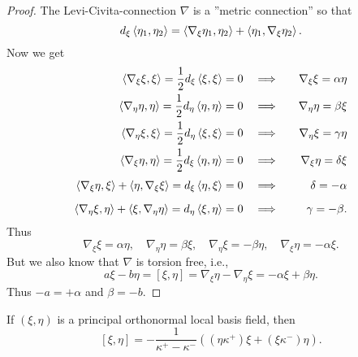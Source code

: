 \begin{proof}
	
	The Levi-Civita-connection $ \nabla $ is a ''metric connection'' so that 
		\[ d_\xi\left \langle \eta_1,\eta_2 \right\rangle = \left \langle \nabla_\xi \eta_1,\eta_2 \right\rangle +\left \langle \eta_1,\nabla_\xi \eta_2 \right\rangle. \]
	Now we get
	\begin{align*}
		\left \langle \nabla_\xi \xi,\xi \right\rangle = \dfrac{1}{2} d_\xi\left \langle \xi,\xi \right\rangle = 0 
			&&& \Longrightarrow &&& \nabla_\xi\xi = \alpha\eta\\
		\left \langle \nabla_\eta \eta,\eta \right\rangle = \dfrac{1}{2} d_\eta\left \langle \eta,\eta \right\rangle = 0 
			&&& \Longrightarrow &&& \nabla_\eta \eta  = \beta \xi \\
		\left \langle \nabla_\eta \xi, \xi \right\rangle = \frac 12 d_\eta \left \langle \xi,\xi \right\rangle = 0 
			&&& \Longrightarrow &&& \nabla_\eta \xi  = \gamma \eta \\
		\left \langle \nabla_\xi \eta, \eta \right\rangle = \frac 12 d_\xi \left \langle \eta,\eta \right\rangle = 0 
			&&& \Longrightarrow &&& \nabla_\xi \eta  = \delta \xi \\[1mm]
		\left \langle \nabla_\xi \eta,\xi \right\rangle + \left \langle \eta,\nabla_\xi \xi \right\rangle = d_\xi\left \langle \eta,\xi \right\rangle = 0
			&&& \Longrightarrow &&&  \delta =- \alpha \\[2mm]
		\left \langle \nabla_\eta \xi,\eta \right\rangle + \left \langle \xi,\nabla_\eta \eta \right\rangle = d_\eta\left \langle \xi,\eta \right\rangle = 0
			&&& \Longrightarrow &&&  \gamma =- \beta. \\
	\end{align*}
	Thus 
	\[ \nabla_\xi \xi = \alpha \eta, \quad \nabla_\eta \eta = \beta \xi, \quad \nabla_\eta \xi =  -\beta\eta, \quad \nabla_\xi \eta = -\alpha \xi. \]
	But we also know that $ \nabla $ is torsion free, i.e.,
	\[ a \xi - b \eta  = [\xi,\eta] = \nabla_\xi \eta - \nabla_\eta \xi = - \alpha\xi + \beta \eta. \]
	Thus $ -a = +  \alpha$ and $ \beta = -b $.
		 	
\end{proof}

\begin{lemma}
	
	If $ (\xi,\eta) $ is a principal orthonormal local basis field, then
		\[ [\xi,\eta] = - \dfrac{1}{\kappa^+ - \kappa^-}((\eta\kappa^+)\xi + (\xi\kappa^-)\eta). \]
	
\end{lemma}

